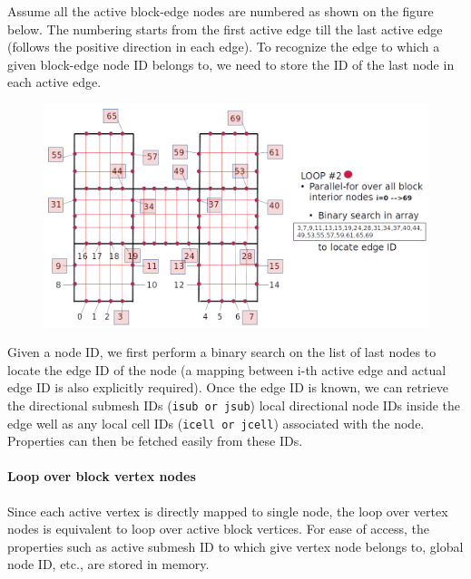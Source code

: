 \documentclass[a4paper,12pt]{article}
\begin{document}
Assume all the active block-edge nodes are numbered as shown on the figure below. The numbering starts from the first active edge till the last active edge (follows the positive direction in each edge). To recognize the edge to which a given block-edge node ID belongs to, we need to store the ID of the last node in each active edge. 
\begin{figure}[H]
	\centering
	\includegraphics[scale=0.4]{figures/BlockEdgeLoop.png}
\end{figure}

Given a node ID, we first perform a binary search on the list of last nodes to locate the edge ID of the node (a mapping between i-th active edge and actual edge ID is also explicitly required). Once the edge ID is known, we can retrieve the directional submesh IDs (\texttt{isub or jsub}) local directional node IDs inside the edge well as any local cell IDs (\texttt{icell or jcell}) associated with the node. Properties can then be fetched easily from these IDs.

\paragraph{Loop over block vertex nodes}
Since each active vertex is directly mapped to single node, the loop over vertex nodes is equivalent to loop over active block vertices. For ease of access, the properties such as active submesh ID to which give vertex node belongs to, global node ID, etc., are stored in memory.   

\end{document}
